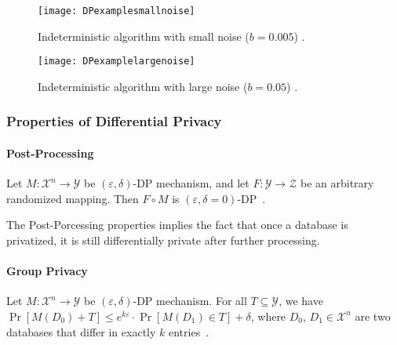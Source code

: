 \begin{figure}[htbp]
    \texttt{[image: DPexamplesmallnoise]}
    \centering
    \caption{Indeterministic algorithm with small noise ($b=0.005$) .}
    \label{img:DPexamplesmallnoise}
\end{figure}
\FloatBarrier

\begin{figure}[htbp]
    \texttt{[image: DPexamplelargenoise]}
    \centering
    \caption{Indeterministic algorithm with large noise ($b=0.05$) .}
    \label{img:DPexamplelargenoise}
\end{figure}
\FloatBarrier

\subsubsection{Properties of Differential Privacy}

\paragraph{Post-Processing}
\begin{theorem} Let $M:\mathcal{X}^{n} \rightarrow \mathcal{Y}$ be $\left( \varepsilon ,\delta \right)$-DP mechanism, and let $F:\mathcal{Y}\rightarrow \mathcal{Z}$  be an arbitrary randomized mapping. Then $F\circ M$ is $\left( \varepsilon ,\delta=0 \right)$-DP~\cite{dwork2014algorithmic}.
\end{theorem}
The Post-Porcessing properties implies the fact that once a database is privatized, it is still differentially private after further processing.

\paragraph{Group Privacy}
\begin{theorem} Let $M:\mathcal{X}^{n} \rightarrow \mathcal{Y}$ be $\left( \varepsilon ,\delta \right)$-DP mechanism. For all $T\subseteq \mathcal{Y}$, we have $\Pr \left[ M\left(D_{0}\right) +T\right] \leq e^{k \varepsilon}\cdot \Pr \left[ M\left( D_{1}\right) \in T\right] +\delta$, where $D_{0}$, $D_{1}\in \mathcal{X}^{n}$ are two databases that differ in exactly $k$ entries~\cite{dwork2014algorithmic}.
\end{theorem}

